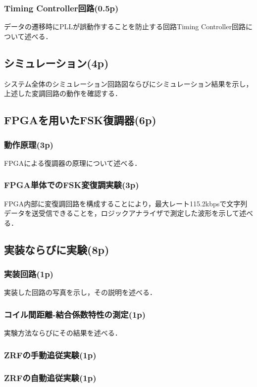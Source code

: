 \documentclass{jsarticle}
\begin{document}
\subsubsection{Timing Controller回路(0.5p)}
データの遷移時にPLLが誤動作することを防止する回路Timing Controller回路について述べる．

\subsection{シミュレーション(4p)}
システム全体のシミュレーション回路図ならびにシミュレーション結果を示し，上述した変調回路の動作を確認する．


\subsection{FPGAを用いたFSK復調器(6p)}
\subsubsection{動作原理(3p)}
FPGAによる復調器の原理について述べる．

\subsubsection{FPGA単体でのFSK変復調実験(3p)}
FPGA内部に変復調回路を構成することにより，最大レート115.2kbpsで文字列データを送受信できることを，ロジックアナライザで測定した波形を示して述べる．


\subsection{実装ならびに実験(8p)}
\subsubsection{実装回路(1p)}
実装した回路の写真を示し，その説明を述べる．
\subsubsection{コイル間距離-結合係数特性の測定(1p)}
実験方法ならびにその結果を述べる．

\subsubsection{ZRFの手動追従実験(1p)}

\subsubsection{ZRFの自動追従実験(1p)}
\end{document}
